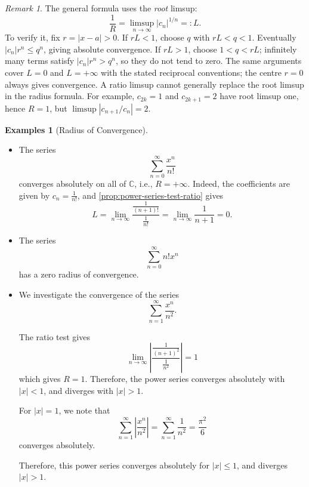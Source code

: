 \documentclass[11pt]{article}
\numberwithin{equation}{section}
\theoremstyle{definition}
\newtheorem{examples}[theorem]{Examples}
\theoremstyle{remark}
\newtheorem{remark}[theorem]{Remark}
\newcommand{\pqty}[1]{\left(#1\right)}
\newcommand{\abs}[1]{\left|#1\right|}
\newcommand{\flatfrac}[2]{\frac{#1}{#2}}
\newcommand{\CC}{\mathbb C}
\newcommand{\plusinfty}{+\infty}
\begin{document}
\begin{remark}\label{analysis-unit-0208}
    The general formula uses the \emph{root} limsup:
\[
\frac1R=\limsup_{n\to\infty}|c_n|^{1/n}=:L.
\]
To verify it, fix \(r=|x-a|>0\). If \(rL<1\), choose \(q\) with \(rL<q<1\).
Eventually \(|c_n|r^n\le q^n\), giving absolute convergence. If \(rL>1\), choose
\(1<q<rL\); infinitely many terms satisfy \(|c_n|r^n>q^n\), so they do not tend
to zero. The same arguments cover \(L=0\) and \(L=+\infty\) with the stated
reciprocal conventions; the centre \(r=0\) always gives convergence.
A ratio limsup cannot generally replace the root limsup in the radius formula.
For example, \(c_{2k}=1\) and \(c_{2k+1}=2\) have root limsup one, hence \(R=1\),
but \(\limsup|c_{n+1}/c_n|=2\).
\end{remark}

\begin{examples}[Radius of Convergence]\label{analysis-unit-0209}
    \label{ex:radius-of-convergence}%
    \begin{itemize}
        \item The series
        \[
            \sum_{n = 0}^{\infty} \frac{x^n}{n!}
        \]
        converges absolutely on all of \(\CC\), i.e., \(R = \plusinfty\). Indeed, the coefficients are given by \(c_n = \frac{1}{n!}\), and \autoref{prop:power-series-test-ratio} gives
        \[
            L = \lim_{n \to \infty} \frac{\flatfrac{1}{\pqty{n + 1}!}}{\flatfrac{1}{n!}} = \lim_{n \to \infty} \frac{1}{n + 1} = 0.
        \]
        
        \item The series
        \[
            \sum_{n = 0}^{\infty} n! x^n
        \]
        has a zero radius of convergence.

        \item We investigate the convergence of the series
        \[
            \sum_{n = 1}^{\infty} \frac{x^n}{n^2}.
        \]

        The ratio test gives
        \[
            \lim_{n \to \infty} \abs{\frac{\frac{1}{\pqty{n + 1}^2}}{\frac{1}{n^2}}} = 1
        \]
        which gives \(R = 1\). Therefore, the power series converges absolutely with \(\abs{x} < 1\), and diverges with \(\abs{x} > 1\).

        For \(\abs{x} = 1\), we note that
        \[
            \sum_{n = 1}^{\infty} \abs{\frac{x^n}{n^2}} = \sum_{n = 1}^{\infty} \frac{1}{n^2} = \frac{\pi^2}{6}
        \]
        converges absolutely.

        Therefore, this power series converges absolutely for \(\abs{x} \leq 1\), and diverges \(\abs{x} > 1\).


\end{itemize}
\end{examples}
\end{document}
